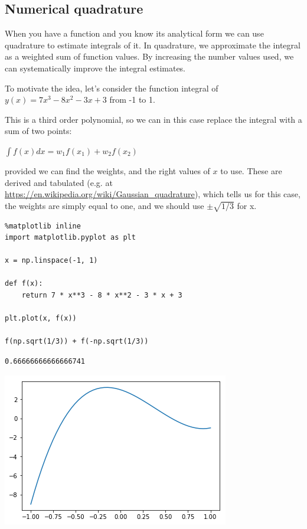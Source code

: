 \documentclass[11pt]{article}
\begin{document}
\subsection{Numerical quadrature}
\label{sec:orgd410364}

When you have a function and you know its analytical form we can use quadrature to estimate integrals of it. In quadrature, we approximate the integral as a weighted sum of function values. By increasing the number values used, we can systematically improve the integral estimates.

To motivate the idea, let's consider the function integral of \(y(x) = 7 x^3 - 8 x^2 - 3x +3\) from -1 to 1.

This is a third order polynomial, so we can in this case replace the integral with a sum of two points:

\(\int f(x) dx = w_1 f(x_1) + w_2 f(x_2)\)

provided we can find the weights, and the right values of \(x\) to use. These are derived and tabulated (e.g. at \url{https://en.wikipedia.org/wiki/Gaussian\_quadrature}), which tells us for this case, the weights are simply equal to one, and we should use \(\pm \sqrt{1/3}\) for x.

\begin{verbatim}
%matplotlib inline
import matplotlib.pyplot as plt

x = np.linspace(-1, 1)

def f(x):
    return 7 * x**3 - 8 * x**2 - 3 * x + 3

plt.plot(x, f(x))

f(np.sqrt(1/3)) + f(-np.sqrt(1/3))
\end{verbatim}

\begin{verbatim}
0.66666666666666741
\end{verbatim}



\begin{center}
\includegraphics[width=.9\linewidth]{obipy-resources/d9632b07b477acbf48eabd2bf122330e-181BeY.png}
\end{center}
\end{document}
